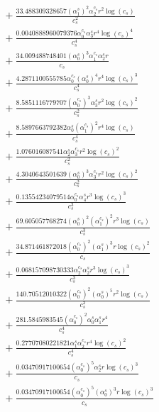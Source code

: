 \documentclass[10pt]{article}
\begin{document}
\begin{align*}
&{}  + \frac{33.488309328657 \left(\alpha_{1}^s\right)^{2} \alpha_{2}^{c_s} r^{2} \log{\left(c_{s} \right)}}{c_{s}^{2}} \\
&{}  + \frac{0.0040888960079376 \alpha_{0}^{c_s} \alpha_{3}^s r^{4} \log{\left(c_{s} \right)}^{4}}{c_{s}^{4}} \\
&{}  + \frac{34.009488748401 \left(\alpha_{0}^s\right)^{3} \alpha_{1}^{c_s} \alpha_{2}^s r}{c_{s}} \\
&{}  + \frac{4.2871100555785 \alpha_{0}^{c_s} \left(\alpha_{0}^s\right)^{4} r^{4} \log{\left(c_{s} \right)}^{3}}{c_{s}^{4}} \\
&{}  + \frac{8.5851116779707 \left(\alpha_{0}^{c_s}\right)^{3} \alpha_{3}^s r^{2} \log{\left(c_{s} \right)}^{2}}{c_{s}^{2}} \\
&{}  + \frac{8.5897663792382 \alpha_{0}^s \left(\alpha_{1}^{c_s}\right)^{2} r^{4} \log{\left(c_{s} \right)}}{c_{s}^{4}} \\
&{}  + \frac{1.076016087541 \alpha_{2}^s \alpha_{3}^{c_s} r^{2} \log{\left(c_{s} \right)}^{2}}{c_{s}^{2}} \\
&{}  + \frac{4.3040643501639 \left(\alpha_{0}^s\right)^{3} \alpha_{3}^{c_s} r^{2} \log{\left(c_{s} \right)}^{2}}{c_{s}^{2}} \\
&{}  + \frac{0.13554234079514 \alpha_{0}^{c_s} \alpha_{4}^s r^{3} \log{\left(c_{s} \right)}^{3}}{c_{s}^{3}} \\
&{}  + \frac{69.605057768274 \left(\alpha_{0}^s\right)^{2} \left(\alpha_{1}^{c_s}\right)^{2} r^{3} \log{\left(c_{s} \right)}}{c_{s}^{3}} \\
&{}  + \frac{34.871461872018 \left(\alpha_{0}^{c_s}\right)^{2} \left(\alpha_{1}^s\right)^{3} r \log{\left(c_{s} \right)}^{2}}{c_{s}} \\
&{}  + \frac{0.068157098730333 \alpha_{2}^{c_s} \alpha_{2}^s r^{3} \log{\left(c_{s} \right)}^{3}}{c_{s}^{3}} \\
&{}  + \frac{140.70512010322 \left(\alpha_{0}^{c_s}\right)^{2} \left(\alpha_{0}^s\right)^{5} r^{2} \log{\left(c_{s} \right)}}{c_{s}^{2}} \\
&{}  + \frac{281.5845983545 \left(\alpha_{0}^{c_s}\right)^{2} \alpha_{0}^s \alpha_{1}^s r^{4}}{c_{s}^{4}} \\
&{}  + \frac{0.27707080221821 \alpha_{1}^s \alpha_{2}^{c_s} r^{4} \log{\left(c_{s} \right)}^{2}}{c_{s}^{4}} \\
&{}  + \frac{0.03470917100654 \left(\alpha_{0}^{c_s}\right)^{5} \alpha_{2}^s r \log{\left(c_{s} \right)}^{3}}{c_{s}} \\
&{}  + \frac{0.03470917100654 \left(\alpha_{0}^{c_s}\right)^{5} \left(\alpha_{0}^s\right)^{3} r \log{\left(c_{s} \right)}^{3}}{c_{s}} \\

\end{align*}
\end{document}
